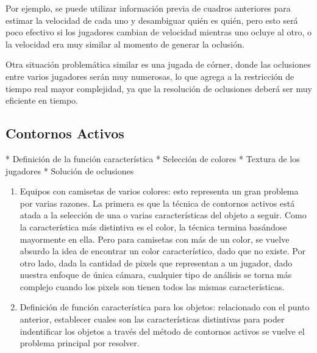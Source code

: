 \documentclass[a4paper,10pt]{article}
\begin{document}
Por ejemplo, se puede utilizar información previa de cuadros anteriores para
estimar la velocidad de cada uno y desambiguar quién es quién, pero esto
será poco efectivo si los jugadores cambian de velocidad mientras uno ocluye
al otro, o la velocidad era muy similar al momento de generar la oclusión.

Otra situación problemática similar es una jugada de córner, donde las
oclusiones entre varios jugadores serán muy numerosas, lo que agrega a la
restricción de tiempo real mayor complejidad, ya que la resolución de
oclusiones deberá ser muy eficiente en tiempo.

\subsection{Contornos Activos}

* Definición de la función característica
  * Selección de colores
  * Textura de los jugadores
* Solución de oclusiones

\begin{enumerate}
    \item Equipos con camisetas de varios colores: esto representa un gran problema por varias razones. La primera es que la técnica de contornos activos
        está atada a la selección de una o varias características del objeto a seguir. Como la característica más distintiva es el color, la técnica termina
        basándose mayormente en ella. Pero para camisetas con más de un color, se vuelve absurdo la idea de encontrar un color característico,
        dado que no existe. Por otro lado, dada la cantidad de pixels que representan a un jugador, dado nuestra enfoque de única cámara, cualquier
        tipo de análisis se torna más complejo cuando los pixels son tienen todos las mismas características.
    \item Definición de función característica para los objetos: relacionado con el punto anterior, establecer cuales son las características distintivas para
        poder indentificar los objetos a través del método de contornos activos se vuelve el problema principal por resolver.
\end{enumerate}
\end{document}

